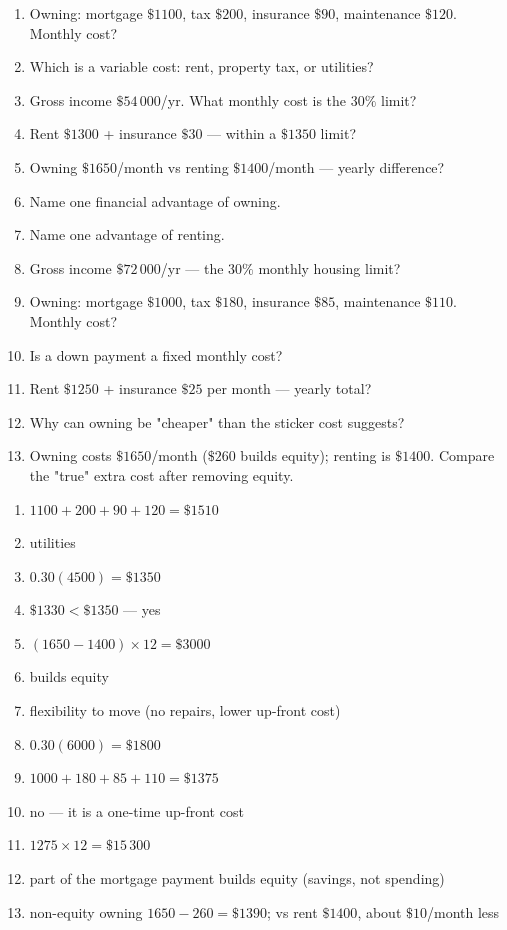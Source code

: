 \documentclass[11pt]{article}
\begin{document}
\begin{recapbox}
\begin{multicols}{2}
\small
\begin{enumerate}[leftmargin=*,itemsep=3pt]
  \item Owning: mortgage $\$1100$, tax $\$200$, insurance $\$90$, maintenance $\$120$. Monthly cost?
  \item Which is a variable cost: rent, property tax, or utilities?
  \item Gross income $\$54\,000$/yr. What monthly cost is the $30\%$ limit?
  \item Rent $\$1300$ + insurance $\$30$ — within a $\$1350$ limit?
  \item Owning $\$1650$/month vs renting $\$1400$/month — yearly difference?
  \item Name one financial advantage of owning.
  \item Name one advantage of renting.
  \item Gross income $\$72\,000$/yr — the $30\%$ monthly housing limit?
  \item Owning: mortgage $\$1000$, tax $\$180$, insurance $\$85$, maintenance $\$110$. Monthly cost?
  \item Is a down payment a fixed monthly cost?
  \item Rent $\$1250$ + insurance $\$25$ per month — yearly total?
  \item Why can owning be "cheaper" than the sticker cost suggests?
  \item Owning costs $\$1650$/month ($\$260$ builds equity); renting is $\$1400$. Compare the "true" extra cost after removing equity.
\end{enumerate}
\end{multicols}
\end{recapbox}

\begin{keybox}
\begin{multicols}{2}
\small
\begin{enumerate}[leftmargin=*,itemsep=3pt]
  \item $1100+200+90+120=\$1510$
  \item utilities
  \item $0.30(4500)=\$1350$
  \item $\$1330<\$1350$ — yes
  \item $(1650-1400)\times12=\$3000$
  \item builds equity
  \item flexibility to move (no repairs, lower up-front cost)
  \item $0.30(6000)=\$1800$
  \item $1000+180+85+110=\$1375$
  \item no — it is a one-time up-front cost
  \item $1275\times12=\$15\,300$
  \item part of the mortgage payment builds equity (savings, not spending)
  \item non-equity owning $1650-260=\$1390$; vs rent $\$1400$, about $\$10$/month less
\end{enumerate}
\end{multicols}
\end{keybox}
\end{document}
